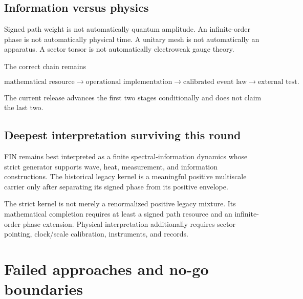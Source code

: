 \documentclass[11pt,a4paper,openany]{report}
\begin{document}
\section{Information versus physics}

Signed path weight is not automatically quantum amplitude. An infinite-order phase is not automatically physical time. A unitary mesh is not automatically an apparatus. A sector torsor is not automatically electroweak gauge theory.

The correct chain remains

\[
\text{mathematical resource}
\to
\text{operational implementation}
\to
\text{calibrated event law}
\to
\text{external test}.
\]

The current release advances the first two stages conditionally and does not claim the last two.

\section{Deepest interpretation surviving this round}

FIN remains best interpreted as a finite spectral-information dynamics whose strict generator supports wave, heat, measurement, and information constructions. The historical legacy kernel is a meaningful positive multiscale carrier only after separating its signed phase from its positive envelope.

The strict kernel is not merely a renormalized positive legacy mixture. Its mathematical completion requires at least a signed path resource and an infinite-order phase extension. Physical interpretation additionally requires sector pointing, clock/\allowbreak{}scale calibration, instruments, and records.

\chapter{Failed approaches and no-go boundaries}
\end{document}
